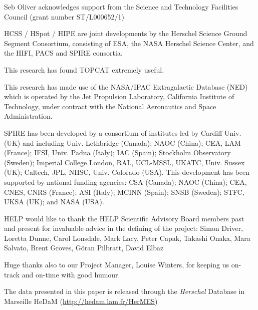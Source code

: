 \documentclass[usenatbib]{mnras}
\begin{document}
Seb Oliver acknowledges support from the Science and Technology Facilities
Council (grant number ST/L000652/1)


HCSS / HSpot / HIPE are joint developments by the Herschel Science Ground
Segment Consortium, consisting of ESA, the NASA Herschel Science Center, and the
HIFI, PACS and SPIRE consortia.

This research has found TOPCAT \citep{2005ASPC..347...29T} extremely useful.

This research has made use of the NASA/IPAC Extragalactic Database (NED) which
is operated by the Jet Propulsion Laboratory, California Institute of
Technology, under contract with the National Aeronautics and Space
Administration.

SPIRE has been developed by a consortium of institutes led by Cardiff Univ. (UK)
and including Univ. Lethbridge (Canada); NAOC (China); CEA, LAM (France); IFSI,
Univ. Padua (Italy); IAC (Spain); Stockholm Observatory (Sweden); Imperial
College London, RAL, UCL-MSSL, UKATC, Univ. Sussex (UK); Caltech, JPL, NHSC,
Univ. Colorado (USA). This development has been supported by national funding
agencies: CSA (Canada); NAOC (China); CEA, CNES, CNRS (France); ASI (Italy);
MCINN (Spain); SNSB (Sweden); STFC, UKSA (UK); and NASA (USA).

HELP would like to thank the HELP Scientific Advisory Board members past and
present for invaluable advice in the defining of the project: Simon Driver,
Loretta Dunne, Carol Lonsdale, Mark Lacy, Peter Capak, Takashi Onaka, Mara
Salvato, Brent Groves, G\"{o}ran Pilbratt, David Elbaz

Huge thanks also to our Project Manager, Louise Winters, for keeping us on-track
and on-time with good humour.

The data presented in this paper is released through the {\em Herschel} Database
in Marseille HeDaM ({\url{http://hedam.lam.fr/HerMES}})





\appendix



\end{document}
